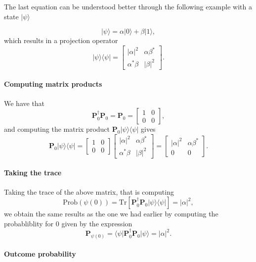 The last equation can be understood better through the following example with a state $\vert \psi\rangle$

\[
\vert \psi \rangle = \alpha \vert 0\rangle+\beta \vert 1\rangle,
\]
which results in a projection operator
\[
\vert \psi \rangle\langle \psi\vert = \begin{bmatrix} \vert \alpha \vert^2 & \alpha\beta^* \\ \alpha^*\beta & \vert\beta\vert^2\end{bmatrix}.
\]


\paragraph{Computing matrix products}
We have that
\[
\bm{P}_0^{\dagger}\bm{P}_0=\bm{P}_0=\begin{bmatrix} 1 & 0 \\ 0 & 0\end{bmatrix},
\]
and computing the matrix product $\bm{P}_0\vert\psi\rangle\langle \psi\vert$ gives
\[
\bm{P}_0\vert\psi\rangle\langle \psi\vert=\begin{bmatrix} 1 & 0 \\ 0 & 0\end{bmatrix}\begin{bmatrix} \vert \alpha \vert^2 & \alpha\beta^* \\ \alpha^*\beta & \vert\beta\vert^2\end{bmatrix}=\begin{bmatrix} \vert \alpha \vert^2 & \alpha\beta^* \\ 0 & 0\end{bmatrix}.
\]


\paragraph{Taking the trace}

Taking the trace of the above matrix, that is computing
\[
\mathrm{Prob}(\psi(0))=\mathrm{Tr}\left[\bm{P}_0^{\dagger}\bm{P}_0\vert \psi\rangle\langle \psi\vert\right]=\vert \alpha\vert^2,
\]
we obtain the same results as the one we had earlier by computing
the probabliblity for $0$ given by the expression
\[
\bm{P}_{\psi(0)}=\langle \psi\vert \bm{P}_0^{\dagger}\bm{P}_0\vert \psi\rangle=\vert \alpha\vert^2.
\]


\paragraph{Outcome probability}


